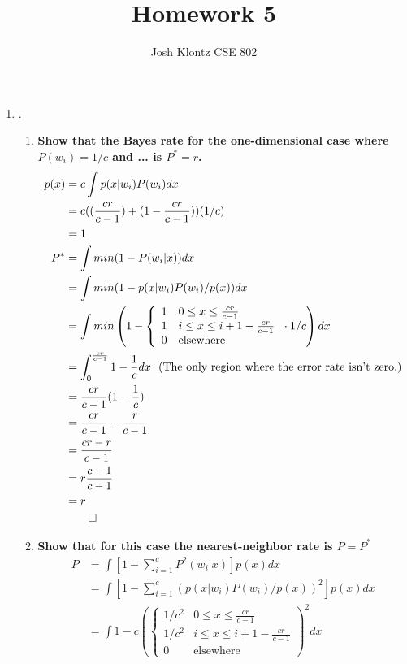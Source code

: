 \documentclass[12pt]{article}
\begin{document}
 
\title{Homework 5}
\author{Josh Klontz
CSE 802}
 
\maketitle

\begin{enumerate}
\item {}.
\begin{enumerate}
\item \textbf{Show that the Bayes rate for the one-dimensional case where $P(w_i)=1/c$ and ... is $P^* = r$.}
\begin{equation}
\begin{split}
p(x) &= c\int p(x|w_i)P(w_i) dx \\
       &= c((\frac{cr}{c-1}) + (1 - \frac{cr}{c-1}))(1/c) \\
       &=1 \\
P^* &= \int min(1-P(w_i|x)) dx \\
      &= \int min(1-p(x|w_i)P(w_i)/p(x)) dx \\
      &= \int min \left(1-\left\{ \begin{array}{rl} 1 & 0\leq x \leq \frac{cr}{c-1} \\ 1 & i \leq x \leq i+1-\frac{cr}{c-1} \\ 0 & \text{elsewhere} \end{array} \right. \cdot 1/c \right) dx \\
      &= \int_0^\frac{cr}{c-1}1-\frac{1}{c}dx~~\text{(The only region where the error rate isn't zero.)} \\
      &= \frac{cr}{c-1}(1-\frac{1}{c}) \\
      &= \frac{cr}{c-1} - \frac{r}{c-1} \\
      &= \frac{cr-r}{c-1} \\
      &= r\frac{c-1}{c-1} \\
      &= r \\
      & \qed
\end{split}
\end{equation}
\item \textbf{Show that for this case the nearest-neighbor rate is $P=P^*$}
\begin{equation}
\begin{split}
P &= \int \left[1-\sum_{i=1}^c P^2(w_i|x) \right]p(x)dx \\
   &= \int \left[1-\sum_{i=1}^c (p(x|w_i)P(w_i)/p(x))^2 \right]p(x)dx \\
   &= \int 1-c \left( \left\{ \begin{array}{rl} 1/c^2 & 0\leq x \leq \frac{cr}{c-1} \\ 1/c^2 & i \leq x \leq i+1-\frac{cr}{c-1} \\ 0 & \text{elsewhere} \end{array} \right. \right)^2 dx \\

\end{split}
\end{equation}
\end{enumerate}
\end{enumerate}
\end{document}
